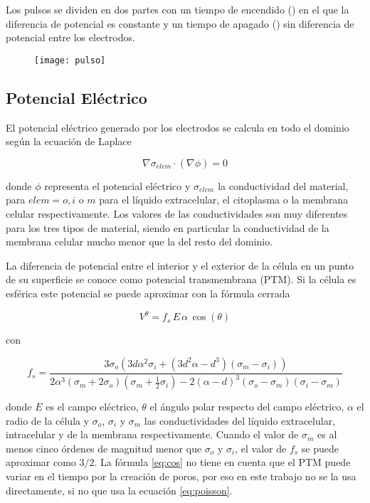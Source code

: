 Los pulsos se dividen en dos partes con un tiempo de encendido (\ontime) en el que la diferencia de potencial es constante y un tiempo de apagado (\offtime) sin diferencia de potencial entre los electrodos.

\begin{figure}[h]
	\centering
	\texttt{[image: pulso]}
\end{figure}


\subsection*{Potencial Eléctrico}
El potencial eléctrico generado por los electrodos se calcula en todo el dominio según la ecuación de Laplace \cite{c9-fem-electro}

\begin{equation} \label{eq:poisson}
	\nabla \sigma_{elem} \cdot (\nabla \phi) = 0 
\end{equation}

donde $\phi$ representa el potencial eléctrico y $\sigma_{elem}$ la conductividad del material, para $elem = o, i$ o $m$ para el líquido extracelular, el citoplasma o la membrana celular respectivamente. Los valores de las conductividades son muy diferentes para los tres tipos de material, siendo en particular la conductividad de la membrana celular mucho menor que la del resto del dominio.

La diferencia de potencial entre el interior y el exterior de la célula en un punto de su superficie se conoce como potencial transmembrana (PTM). Si la célula es esférica este potencial se puede aproximar con la fórmula cerrada \cite{tsong}

\begin{equation} \label{eq:cos}
	 V^{\theta} = f_s\, E\, \alpha\, \cos (\theta) 
\end{equation}

con

\begin{equation} \label{eq:lambda}
    f_s = \frac{3\sigma_o \left( 3 d \alpha^2 \sigma_i + \left( 3 d^2 \alpha - d^3 \right) \left(\sigma_m - \sigma_i \right) \right)}{2 \alpha^3 \left( \sigma_m + 2 \sigma_o \right) \left(\sigma_m + \frac{1}{2} \sigma_i \right) - 2 \left(\alpha - d \right)^3 \left(\sigma_o - \sigma_m \right) \left( \sigma_i - \sigma_m \right)}
\end{equation}

donde $E$ es el campo eléctrico, $\theta$ el ángulo polar respecto del campo eléctrico, $\alpha$ el radio de la célula y $\sigma_o$, $\sigma_i$ y $\sigma_m$ las conductividades del líquido extracelular, intracelular y de la membrana respectivamente. Cuando el valor de $\sigma_m$ es al menos cinco órdenes de magnitud menor que $\sigma_o$ y $\sigma_i$, el valor de $f_s$ se puede aproximar como $3/2$\cite{c5-puchiar}. La fórmula \ref{eq:cos} no tiene en cuenta que el PTM puede variar en el tiempo por la creación de poros, por eso en este trabajo no se la usa directamente, si no que usa la ecuación \ref{eq:poisson}.

